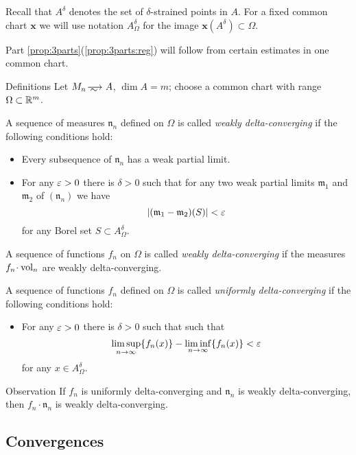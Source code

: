 Recall that $A^\delta$ denotes the set of $\delta$-strained points in $A$.
For a fixed common chart $\bm{x}$ we will use notation $A^\delta_\Omega$ for the image $\bm{x}(A^\delta)\subset \Omega$.

Part \ref{prop:3parts}(\ref{prop:3parts:reg}) will follow from certain estimates in one common chart.

\begin{thm}{Definitions}\label{def:delta-converge}
Let $M_n\smooths{} A$, $\dim A=m$;
choose a common chart with range $\Omega\subset \mathbb{R}^m$.

A sequence of measures $\mathfrak n_n$ defined on $\Omega$ is called \emph{weakly delta-converging}
if the following conditions hold:
\begin{itemize}
 \item Every subsequence of $\mathfrak n_n$ has a weak partial limit.
 \item For any $\varepsilon>0$ there is $\delta>0$ such that for any two weak partial limits $\mathfrak m_1$ and $\mathfrak m_2$ of $(\mathfrak n_n)$ we have  
\[|(\mathfrak m_1-\mathfrak m_2)(S)|<\varepsilon\]
for any Borel set $S\subset A^\delta_\Omega$.
\end{itemize}
A sequence of functions $f_n$ on $\Omega$ is called \emph{weakly delta-converging} if the measures $f_n\cdot \vol_n$ are weakly delta-converging.

A sequence of functions $f_n$ defined on $\Omega$ is called \emph{uniformly delta-converging}
if the following conditions hold:
\begin{itemize}
 \item For any $\varepsilon>0$ there is $\delta>0$ such that such that 
\[\limsup_{n\to\infty} \{f_n(x)\}-\liminf_{n\to\infty}\{f_n(x)\}<  \varepsilon\]
for any $x\in A^\delta_\Omega$.
\end{itemize}

\end{thm}

\begin{thm}{Observation}\label{obs:delta-weak-uniform}
If $f_n$ is uniformly delta-converging and $\mathfrak n_n$ is weakly delta-converging,
then $f_n\cdot \mathfrak n_n$ is weakly delta-converging.
\end{thm}

\subsection{Convergences}\label{sec:test-convergence}


